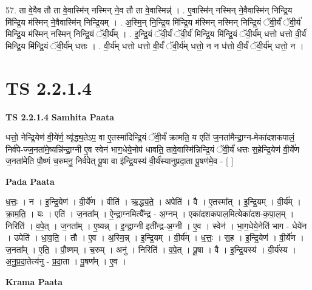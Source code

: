 \documentclass[17pt]{extarticle}
\begin{document}
57. ता वे॒वैव तौ ता वे॒वास्मि॑न् नस्मिन् ने॒व तौ ता वे॒वास्मिन्न्॑ । . ए॒वास्मि॑न् नस्मिन् ने॒वैवास्मि॑न् निन्द्रि॒य मि॑न्द्रि॒य म॑स्मिन् ने॒वैवास्मि॑न् निन्द्रि॒यम् । . अ॒स्मि॒न् नि॒न्द्रि॒य मि॑न्द्रि॒य म॑स्मिन् नस्मिन् निन्द्रि॒यं ॅवी॒र्यं॑ ॅवी॒र्य॑ मिन्द्रि॒य म॑स्मिन् नस्मिन् निन्द्रि॒यं ॅवी॒र्य᳚म् । . इ॒न्द्रि॒यं ॅवी॒र्यं॑ ॅवी॒र्य॑ मिन्द्रि॒य मि॑न्द्रि॒यं ॅवी॒र्य॑म् धत्तो धत्तो वी॒र्य॑ मिन्द्रि॒य मि॑न्द्रि॒यं ॅवी॒र्य॑म् धत्तः । . वी॒र्य॑म् धत्तो धत्तो वी॒र्यं॑ ॅवी॒र्य॑म् धत्तो॒ न न ध॑त्तो वी॒र्यं॑ ॅवी॒र्य॑म् धत्तो॒ न । \newline
\pagebreak
{}

\section{ TS 2.2.1.4 }

\textbf{TS 2.2.1.4 } \newline
\textbf{Samhita Paata} \newline

धत्तो॒ नेन्द्रि॒येण॑ वी॒ये॑र्ण॒ व्यृ॑द्ध्य॒तेऽप॒ वा ए॒तस्मा॑दिन्द्रि॒यं ॅवी॒र्यं॑ क्रामति॒ य एति॑ ज॒नता॑मैन्द्रा॒ग्न-मेका॑दशकपालं॒ निर्व॑पे-ज्ज॒नता॑मे॒ष्यन्नि॑न्द्रा॒ग्नी ए॒व स्वेन॑ भाग॒धेये॒नोप॑ धावति॒ तावे॒वास्मि॑न्निन्द्रि॒यं ॅवी॒र्यं॑ धत्तः स॒हेन्द्रि॒येण॑ वी॒र्ये॑ण ज॒नता॑मेति पौ॒ष्णं च॒रुमनु॒ निर्व॑पेत् पू॒षा वा इ॑न्द्रि॒यस्य॑ वी॒र्य॑स्यानुप्रदा॒ता पू॒षण॑मे॒व - [  ] \newline

\textbf{Pada Paata} \newline

ध॒त्तः॒ । न । इ॒न्द्रि॒येण॑ । वी॒र्ये॑ण । वीति॑ । ऋ॒द्ध्य॒ते॒ । अपेति॑ । वै । ए॒तस्मा᳚त् । इ॒न्द्रि॒यम् । वी॒र्य᳚म् । क्रा॒म॒ति॒ । यः । एति॑ । ज॒नता᳚म् । ऐ॒न्द्रा॒ग्नमित्यै᳚न्द्र - अ॒ग्नम् । एका॑दशकपाल॒मित्येका॑दश-क॒पा॒ल॒म् । निरिति॑ । व॒पे॒त् । ज॒नता᳚म् । ए॒ष्यन्न् । इ॒न्द्रा॒ग्नी इती᳚न्द्र-अ॒ग्नी । ए॒व । स्वेन॑ । भा॒ग॒धेये॒नेति॑ भाग - धेये॑न । उपेति॑ । धा॒व॒ति॒ । तौ । ए॒व । अ॒स्मि॒न्न् । इ॒न्द्रि॒यम् । वी॒र्य᳚म् । ध॒त्तः॒ । स॒ह । इ॒न्द्रि॒येण॑ । वी॒र्ये॑ण । ज॒नता᳚म् । ए॒ति॒ । पौ॒ष्णम् । च॒रुम् । अनु॑ । निरिति॑ । व॒पे॒त् । पू॒षा । वै । इ॒न्द्रि॒यस्य॑ । वी॒र्य॑स्य । अ॒नु॒प्र॒दा॒तेत्य॑नु - प्र॒दा॒ता । पू॒षण᳚म् । ए॒व ।  \newline


\textbf{Krama Paata} \newline
\end{document}
